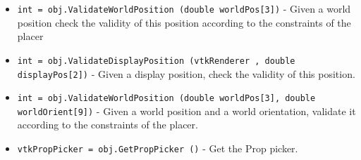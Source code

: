 \begin{itemize}
\item  \verb|int = obj.ValidateWorldPosition (double worldPos[3])| -  Given a world position check the validity of this 
 position according to the constraints of the placer

\item  \verb|int = obj.ValidateDisplayPosition (vtkRenderer , double displayPos[2])| -  Given a display position, check the validity of this position.

\item  \verb|int = obj.ValidateWorldPosition (double worldPos[3], double worldOrient[9])| -  Given a world position and a world orientation,
 validate it according to the constraints of the placer.

\item  \verb|vtkPropPicker = obj.GetPropPicker ()| -  Get the Prop picker.

\end{itemize}
